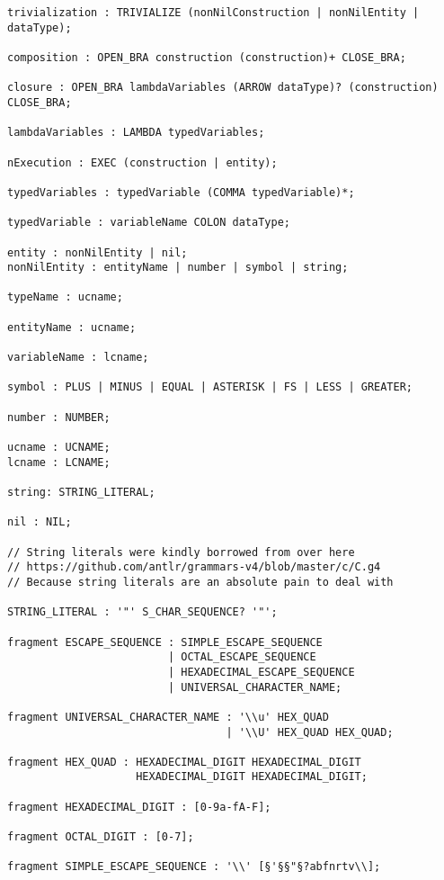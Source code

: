 \begin{lstlisting}[caption=Gramatika jazyka TIL-Script,language=Antlr,escapeinside={{§}{§}}]
trivialization : TRIVIALIZE (nonNilConstruction | nonNilEntity | dataType);

composition : OPEN_BRA construction (construction)+ CLOSE_BRA;

closure : OPEN_BRA lambdaVariables (ARROW dataType)? (construction) CLOSE_BRA;

lambdaVariables : LAMBDA typedVariables;

nExecution : EXEC (construction | entity);

typedVariables : typedVariable (COMMA typedVariable)*;

typedVariable : variableName COLON dataType;

entity : nonNilEntity | nil;
nonNilEntity : entityName | number | symbol | string;

typeName : ucname;

entityName : ucname;

variableName : lcname;

symbol : PLUS | MINUS | EQUAL | ASTERISK | FS | LESS | GREATER;

number : NUMBER;

ucname : UCNAME;
lcname : LCNAME;

string: STRING_LITERAL;

nil : NIL;

// String literals were kindly borrowed from over here
// https://github.com/antlr/grammars-v4/blob/master/c/C.g4
// Because string literals are an absolute pain to deal with

STRING_LITERAL : '"' S_CHAR_SEQUENCE? '"';

fragment ESCAPE_SEQUENCE : SIMPLE_ESCAPE_SEQUENCE
                         | OCTAL_ESCAPE_SEQUENCE
                         | HEXADECIMAL_ESCAPE_SEQUENCE
                         | UNIVERSAL_CHARACTER_NAME;

fragment UNIVERSAL_CHARACTER_NAME : '\\u' HEX_QUAD
                                  | '\\U' HEX_QUAD HEX_QUAD;

fragment HEX_QUAD : HEXADECIMAL_DIGIT HEXADECIMAL_DIGIT
                    HEXADECIMAL_DIGIT HEXADECIMAL_DIGIT;

fragment HEXADECIMAL_DIGIT : [0-9a-fA-F];

fragment OCTAL_DIGIT : [0-7];

fragment SIMPLE_ESCAPE_SEQUENCE : '\\' [§'§§"§?abfnrtv\\];


\end{lstlisting}
